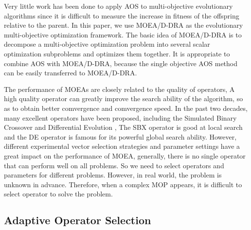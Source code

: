 \documentclass[journal]{IEEEtran}
\begin{document}
Very little work has been done to apply AOS to multi-objective evolutionary algorithms since it is difficult to measure the increase in fitness of the offspring relative to the parent.
% 
In this paper, we use MOEA/D-DRA \cite{moead-dra} as the evolutionary multi-objective optimization framework. The basic idea of MOEA/D-DRA is to decompose a multi-objective optimization problem into several scalar optimization subproblems and optimizes them together.
It is appropriate to combine AOS with MOEA/D-DRA, because the single objective AOS method can be easily transferred to MOEA/D-DRA.

The performance of MOEAs are closely related to the quality of operators, A high quality operator can greatly improve the search ability of the algorithm, so as to obtain better comvergence and comvergence speed.
In the past two decades, many excellent operators have been proposed, including the Simulated Binary Crossover \cite{deb2006reference} and Differential Evolution \cite{storn1997differential}, The SBX operator is good at local search and the DE operator is famous for its powerful global search ability.
However, different experimental vector selection strategies and parameter settings have a great impact on the performance of MOEA, generally, there is no single operator that can perform well on all problems.
So we need to select operators and parameters for different problems. However, in real world, the problem is unknown in advance. Therefore, when a complex MOP appears, it is difficult to select operator to solve the problem.

\subsection{Adaptive Operator Selection}
\end{document}
